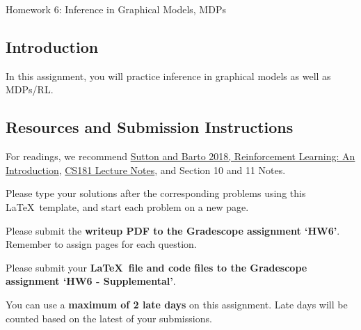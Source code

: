 \documentclass[submit]{harvardml}
\begin{document}
\begin{center}
{\Large Homework 6: Inference in Graphical Models, MDPs}\\
\end{center}

\subsection*{Introduction}

In this assignment, you will practice inference in graphical models as
well as MDPs/RL.

\subsection*{Resources and Submission Instructions}

For readings, we recommend \href{http://incompleteideas.net/book/the-book-2nd.html}{Sutton and Barto 2018, Reinforcement Learning: An Introduction}, \href{https://harvard-ml-courses.github.io/cs181-web/}{CS181  Lecture Notes}, and Section 10 and 11 Notes.

Please type your solutions after the corresponding problems using this
\LaTeX\ template, and start each problem on a new page.

Please submit the \textbf{writeup PDF to the Gradescope assignment `HW6'}. Remember to assign pages for each question.

Please submit your \textbf{\LaTeX\ file and code files to the Gradescope assignment `HW6 - Supplemental'}. 

You can use a \textbf{maximum of 2 late days} on this assignment.  Late days will be counted based on the latest of your submissions. 
\\

\newpage
\end{document}
